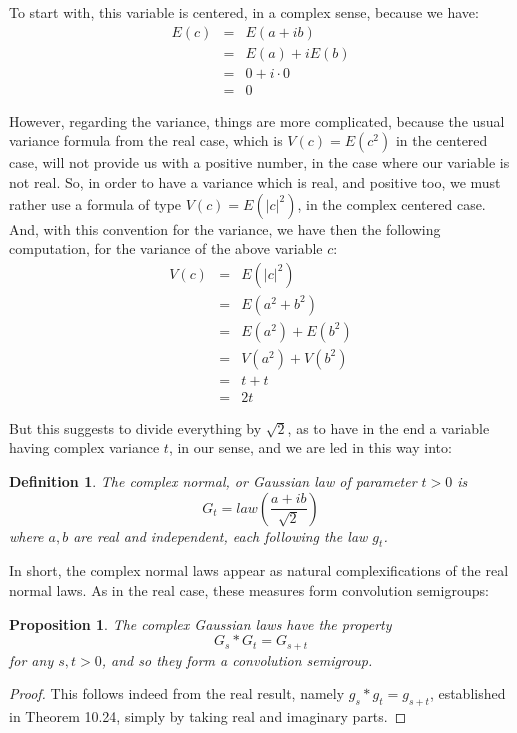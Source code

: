 \documentclass[12pt]{amsbook}
\newtheorem{definition}[theorem]{Definition}
\newtheorem{proposition}[theorem]{Proposition}
\begin{document}
To start with, this variable is centered, in a complex sense, because we have:
\begin{eqnarray*}
E(c)
&=&E(a+ib)\\
&=&E(a)+iE(b)\\
&=&0+i\cdot 0\\
&=&0
\end{eqnarray*}

However, regarding the variance, things are more complicated, because the usual variance formula from the real case, which is $V(c)=E(c^2)$ in the centered case, will not provide us with a positive number, in the case where our variable is not real. So, in order to have a variance which is real, and positive too, we must rather use a formula of type $V(c)=E(|c|^2)$, in the complex centered case. And, with this convention for the variance, we have then the following computation, for the variance of the above variable $c$:
\begin{eqnarray*}
V(c)
&=&E(|c|^2)\\
&=&E(a^2+b^2)\\
&=&E(a^2)+E(b^2)\\
&=&V(a^2)+V(b^2)\\
&=&t+t\\
&=&2t
\end{eqnarray*}

But this suggests to divide everything by $\sqrt{2}$, as to have in the end a variable having complex variance $t$, in our sense, and we are led in this way into:


\begin{definition}
The complex normal, or Gaussian law of parameter $t>0$ is
$$G_t=law\left(\frac{a+ib}{\sqrt{2}}\right)$$
where $a,b$ are real and independent, each following the law $g_t$.
\end{definition}

In short, the complex normal laws appear as natural complexifications of the real normal laws. As in the real case, these measures form convolution semigroups:


\begin{proposition}
The complex Gaussian laws have the property
$$G_s*G_t=G_{s+t}$$
for any $s,t>0$, and so they form a convolution semigroup.
\end{proposition}

\begin{proof}
This follows indeed from the real result, namely $g_s*g_t=g_{s+t}$, established in Theorem 10.24, simply by taking real and imaginary parts.
\end{proof}
\end{document}
